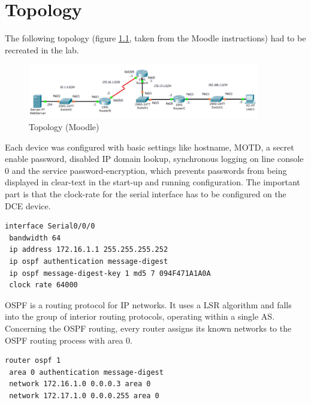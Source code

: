 \chapter{Topology}

\thispagestyle{standard}
\pagestyle{standard}

The following topology (figure \ref{img:topo}, taken from the Moodle instructions) had to be recreated in the lab.

\begin{figure}[H]
	\centering
	\includegraphics[width=0.9\textwidth]{img/topo.png}
	\caption{Topology (Moodle)}
	\label{img:topo}
\end{figure}

Each device was configured with basic settings like hostname, \ac{MOTD}, a secret enable password, disabled IP domain lookup, synchronous logging on line console 0 and the service password-encryption, which prevents passwords from being displayed in clear-text in the start-up and running configuration. The important part is that the clock-rate for the serial interface has to be configured on the \ac{DCE} device.

\begin{lstlisting}[caption={Setting the clock-rate on Router A},label={lst:clockrate},language={}]
interface Serial0/0/0
 bandwidth 64
 ip address 172.16.1.1 255.255.255.252
 ip ospf authentication message-digest
 ip ospf message-digest-key 1 md5 7 094F471A1A0A
 clock rate 64000
\end{lstlisting}

\ac{OSPF} is a routing protocol for \ac{IP} networks. It uses a \ac{LSR} algorithm and falls into the group of interior routing protocols, operating within a single \ac{AS}.
Concerning the \ac{OSPF} routing, every router assigns its known networks to the \ac{OSPF} routing process with area 0.
\newpage
{}%
\begin{lstlisting}[caption={\ac{OSPF} routing example router A},label={lst:ospf},language={}]
router ospf 1
 area 0 authentication message-digest
 network 172.16.1.0 0.0.0.3 area 0
 network 172.17.1.0 0.0.0.255 area 0
\end{lstlisting}

